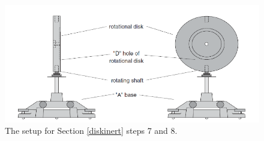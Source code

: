 \begin{figure}[!h]
	\begin{center}
		\includegraphics[width=0.8\linewidth]{./Exp1-7/pic/crazyfig.png}
	\end{center}
	\caption{The setup for Section \ref{diskinert} steps 7 and 8.}
	\label{fig:rotinertias}
\end{figure}

